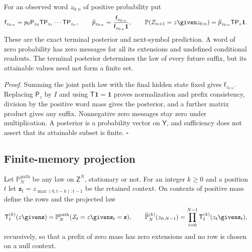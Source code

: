 For an observed word $z_{0:n}$ of positive probability put
\begin{equation}
\mathsf f_{z_{0:n}}=p_0\mathsf P_{z_0}\mathsf T\mathsf P_{z_1}\cdots\mathsf T\mathsf P_{z_n},
\qquad
\widehat p_{z_{0:n}}=\frac{\mathsf f_{z_{0:n}}}{\mathsf f_{z_{0:n}}\mathbf 1},
\qquad
\mathbb P(Z_{n+1}=z\given z_{0:n})=\widehat p_{z_{0:n}}\mathsf T\mathsf P_z\mathbf 1 .
\label{eq:rg-memory-filter}
\end{equation}
These are the exact terminal posterior and next-symbol prediction. A word of zero
probability has zero messages for all its extensions and undefined conditional
readouts. The terminal posterior determines the law of every future suffix, but its
attainable values need not form a finite set. 

\noindent\emph{Proof.}
Summing the joint path law with the final hidden state fixed gives
$\mathsf f_{z_{0:n}}$. Replacing $\mathsf P_z$ by $I$ and using $\mathsf T\mathbf
1=\mathbf 1$ proves normalization and prefix consistency, division by the positive
word mass gives the posterior, and a further matrix product gives any suffix.
Nonnegative zero messages stay zero under multiplication. A posterior is a
probability vector on $\mathsf Y$, and sufficiency does not assert that its
attainable subset is finite. $\square$

\subsection{Finite-memory projection}
\label{sec:rg-memory-projection}
\label{sec:rg-memory-stationary}

Let $\mathbb P^{\mathrm{path}}_N$ be any law on $\mathsf Z^N$, stationary or not. For an
integer $k\ge0$ and a position $t$ let
$\mathbf z_t=z_{\max(0,t-k):t-1}$ be the retained context. On contexts of positive
mass define the rows and the projected law
\begin{equation}
\mathsf T^{(k)}_t(z\given\mathbf z)=\mathbb P^{\mathrm{path}}_N(Z_t=z\given\mathbf z_t=\mathbf z),
\qquad
\widehat{\mathbb P}^{(k)}_N(z_{0:N-1})=\prod_{t=0}^{N-1}\mathsf T^{(k)}_t(z_t\given\mathbf z_t),
\label{eq:rg-memory-projection-product}
\end{equation}
recursively, so that a prefix of zero mass has zero extensions and no row is chosen
on a null context.

